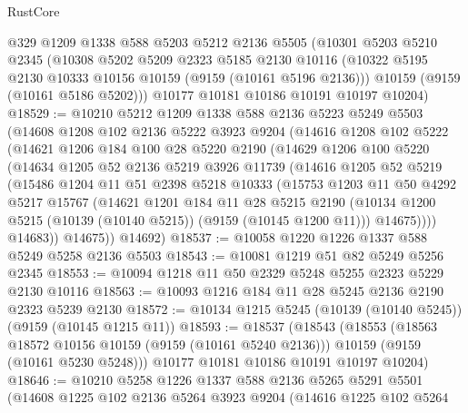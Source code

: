 \begin{lexlean}{RustCore}
\begin{coremodule}
    @329
    @1209
    @1338
    @588
    @5203
    @5212
    @2136
    @5505
    (@10301
      @5203
      @5210
      @2345
      (@10308
        @5202
        @5209
        @2323
        @5185
        @2130
        @10116
        (@10322 @5195 @2130 @10333 @10156 @10159 (@9159 (@10161 @5196 @2136)))
        @10159
        (@9159 (@10161 @5186 @5202)))
      @10177
      @10181
      @10186
      @10191
      @10197
      @10204)
@18529 := @10210
    @5212
    @1209
    @1338
    @588
    @2136
    @5223
    @5249
    @5503
    (@14608
      @1208
      @102
      @2136
      @5222
      @3923
      @9204
      (@14616
        @1208
        @102
        @5222
        (@14621
          @1206
          @184
          @100
          @28
          @5220
          @2190
          (@14629
            @1206
            @100
            @5220
            (@14634
              @1205
              @52
              @2136
              @5219
              @3926
              @11739
              (@14616
                @1205
                @52
                @5219
                (@15486
                  @1204
                  @11
                  @51
                  @2398
                  @5218
                  @10333
                  (@15753
                    @1203
                    @11
                    @50
                    @4292
                    @5217
                    @15767
                    (@14621
                      @1201
                      @184
                      @11
                      @28
                      @5215
                      @2190
                      (@10134 @1200 @5215 (@10139 (@10140 @5215)) (@9159 (@10145 @1200 @11)))
                      @14675))))
              @14683))
          @14675))
      @14692)
@18537 := @10058 @1220 @1226 @1337 @588 @5249 @5258 @2136 @5503
@18543 := @10081 @1219 @51 @82 @5249 @5256 @2345
@18553 := @10094 @1218 @11 @50 @2329 @5248 @5255 @2323 @5229 @2130 @10116
@18563 := @10093 @1216 @184 @11 @28 @5245 @2136 @2190 @2323 @5239 @2130
@18572 := @10134 @1215 @5245 (@10139 (@10140 @5245)) (@9159 (@10145 @1215 @11))
@18593 := @18537
    (@18543
      (@18553
        (@18563 @18572 @10156 @10159 (@9159 (@10161 @5240 @2136)))
        @10159
        (@9159 (@10161 @5230 @5248)))
      @10177
      @10181
      @10186
      @10191
      @10197
      @10204)
@18646 := @10210
    @5258
    @1226
    @1337
    @588
    @2136
    @5265
    @5291
    @5501
    (@14608
      @1225
      @102
      @2136
      @5264
      @3923
      @9204
      (@14616
        @1225
        @102
        @5264

\end{coremodule}
\end{lexlean}
